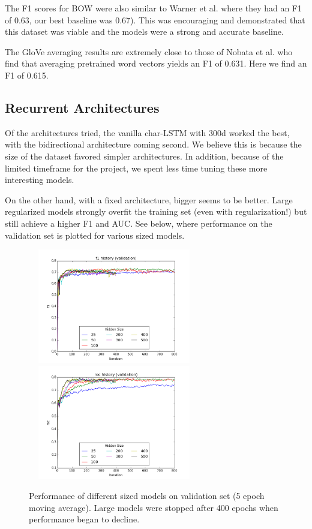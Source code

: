 \documentclass{article} %
\begin{document}
The F1 scores for BOW were also similar to Warner et al. \cite{warner2012detecting} where they had an F1 of 0.63, our best baseline was 0.67). This was encouraging and demonstrated that this dataset was viable and the models were a strong and accurate baseline.

The GloVe averaging results are extremely close to those of Nobata et al. \cite{DBLP:conf/www/NobataTTMC16} who find that averaging pretrained word vectors yields an F1 of 0.631. Here we find an F1 of 0.615. 


\subsection*{Recurrent Architectures}
Of the architectures tried, the vanilla char-LSTM with 300d worked the best, with the bidirectional architecture coming second. We believe this is because the size of the dataset favored simpler architectures. In addition, because of the limited timeframe for the project, we spent less time tuning these more interesting models. 

On the other hand, with a fixed architecture, bigger seems to be better. Large regularized models strongly overfit the training set (even with regularization!) but still achieve a higher F1 and AUC. See below, where performance on the validation set is plotted for various sized models.

\begin{figure}[H]
\label{size-matters}
\hspace*{-0.5cm}
\includegraphics[width=7.5cm, height=5cm]{f1_history_validation_Hidden_Size.png}
\hspace*{-0.0cm}
\includegraphics[width=7.5cm, height=5cm]{roc_history_validation_Hidden_Size.png}
\begin{center}
\caption{Performance of different sized models on validation set (5 epoch moving average). Large models were stopped after 400 epochs when performance began to decline.}
\end{center}
\end{figure}
\end{document}
